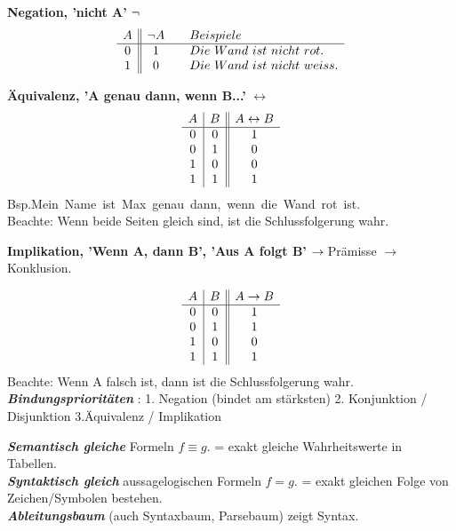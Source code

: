     \item\textbf{Negation, 'nicht A' } $\neg \\
$
     \[
\begin{array}{c || c c l}
    A & \neg A && Beispiele\\ \hline
    0 & 1 && Die\ Wand\ ist\ nicht\ rot. \\
    1 & 0 && Die\ Wand\ ist\ nicht\ weiss. \\
\end{array}
\]


   \textbf{Äquivalenz, 'A genau dann, wenn B...' } $\leftrightarrow	
$ 
    \[
\begin{array}{c | c || c c}
    A & B & A \leftrightarrow B \\ \hline
    0 & 0 & 1 \\
    0 & 1 & 0 \\
    1 & 0 & 0 \\
    1 & 1 & 1 \\
\end{array}
\]
Bsp.Mein\ Name\ ist\ Max\ genau\ dann,\ wenn\ die\ Wand\ rot\ ist.\\
 Beachte: Wenn beide Seiten gleich sind, ist die Schlussfolgerung wahr.


   \item\textbf{Implikation, 'Wenn A, dann B', 'Aus A folgt B' } $\rightarrow	\\
  $Prämisse  $\rightarrow \ $Konklusion.
   
    \[
\begin{array}{c | c || c c}
    A & B & A \rightarrow B \\ \hline
    0 & 0 & 1 \\
    0 & 1 & 1 \\
    1 & 0 & 0 \\
    1 & 1 & 1 \\
\end{array}
\]
 Beachte: Wenn A falsch ist, dann ist die Schlussfolgerung wahr. \\

\textbf{\textit{Bindungsprioritäten}} :
1. Negation (bindet am stärksten)
2. Konjunktion / Disjunktion
3.Äquivalenz / Implikation

 \textbf{\textit{Semantisch gleiche}} Formeln $f \equiv g$. = exakt gleiche Wahrheitswerte in Tabellen.\\
 \textbf{\textit{Syntaktisch gleich}} aussagelogischen Formeln $f = g$. = exakt gleichen Folge von Zeichen/Symbolen bestehen.\\
 \textbf{\textit{Ableitungsbaum}} (auch Syntaxbaum, Parsebaum) zeigt Syntax. \\

